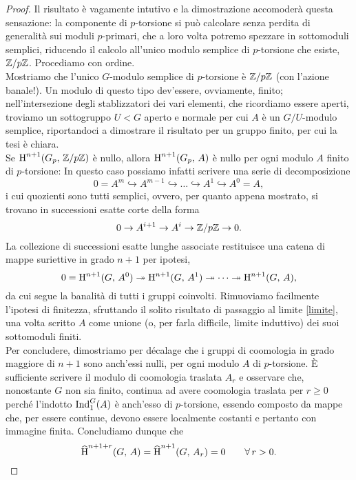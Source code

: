 \begin{proof}
	Il risultato è vagamente intutivo e la dimostrazione accomoderà questa sensazione: la componente di $ p $-torsione si può calcolare senza perdita di generalità sui moduli $ p $-primari, che a loro volta potremo spezzare in sottomoduli semplici, riducendo il calcolo all'unico modulo semplice di $ p $-torsione che esiste, $ \mathbb{Z}/p\mathbb{Z} $. Procediamo con ordine. \\
	
	Mostriamo che l'unico $ G $-modulo semplice di $ p $-torsione è $ \mathbb{Z}/p\mathbb{Z} $ (con l'azione banale!). Un modulo di questo tipo dev'essere, ovviamente, finito; nell'intersezione degli stablizzatori dei vari elementi, che ricordiamo essere aperti, troviamo un sottogruppo $ U < G $ aperto e normale per cui $ A $ è un $ G/U $-modulo semplice, riportandoci a dimostrare il risultato per un gruppo finito, per cui la tesi è chiara. \\
	
	Se $ \operatorname{H}^{n+1}(G_p, \, \mathbb{Z}/p\mathbb{Z}) $ è nullo, allora $ \operatorname{H}^{n+1}(G_p, \, A) $ è nullo per ogni modulo $ A $ finito di $ p $-torsione: In questo caso possiamo infatti scrivere una serie di decomposizione
	\[ 0 = A^m \hookrightarrow A^{m-1} \hookrightarrow \dots \hookrightarrow A^1 \hookrightarrow A^0 = A, \]
	i cui quozienti sono tutti semplici, ovvero, per quanto appena mostrato, si trovano in successioni esatte corte della forma
	\[ 0 \to A^{i+1} \to A^i \to \mathbb{Z}/p\mathbb{Z} \to 0. \]
	La collezione di successioni esatte lunghe associate restituisce una catena di mappe suriettive in grado $ n+1 $ per ipotesi,
	\[ 0 = \operatorname{H}^{n+1}(G, \, A^0) \twoheadrightarrow \operatorname{H}^{n+1}(G, \, A^1) \twoheadrightarrow \dots \twoheadrightarrow \operatorname{H}^{n+1}(G, \, A), \]
	da cui segue la banalità di tutti i gruppi coinvolti. Rimuoviamo facilmente l'ipotesi di finitezza, sfruttando il solito risultato di passaggio al limite \ref{limite}, una volta scritto $ A $ come unione (o, per farla difficile, limite induttivo) dei suoi sottomoduli finiti. \\
	
	Per concludere, dimostriamo per décalage che i gruppi di coomologia in grado maggiore di $ n+1 $ sono anch'essi nulli, per ogni modulo $ A $ di $ p $-torsione. È sufficiente scrivere il modulo di coomologia traslata $ A_{r} $ e osservare che, nonostante $ G $ non sia finito, continua ad avere coomologia traslata per $ r \geq 0 $ perché l'indotto $ \operatorname{Ind}_1^G(A) $ è anch'esso di $ p $-torsione, essendo composto da mappe che, per essere continue, devono essere localmente costanti e pertanto con immagine finita. Concludiamo dunque che	
	\begin{equation*}
	 \operatorname{\widehat{H}}^{n+1+r}(G, \, A) = \operatorname{\widehat{H}}^{n+1}(G, \, A_r) = 0 \qquad \forall\, r > 0. \qedhere
	\end{equation*}
\end{proof}

